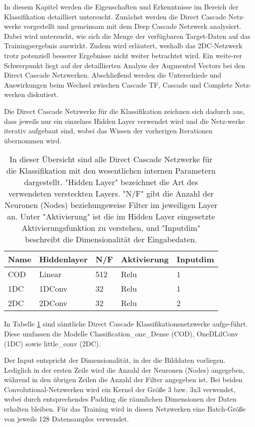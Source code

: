 In diesem Kapitel werden die Eigenschaften und Erkenntnisse im Bereich der Klassifikation detailliert untersucht. Zunächst werden die Direct 
Cascade Netz-werke vorgestellt und gemeinsam mit dem Deep Cascade Netzwerk analysiert. Dabei wird untersucht, wie sich die Menge der verfügbaren 
Target-Daten auf das Trainingsergebnis auswirkt. Zudem wird erläutert, weshalb das 2DC-Netzwerk trotz potenziell besserer Ergebnisse nicht weiter 
betrachtet wird. Ein weite-rer Schwerpunkt liegt auf der detaillierten Analyse der Augmented Vectors bei den Direct Cascade Netzwerken. 
Abschließend werden die Unterschiede und Auswirkungen beim Wechsel zwischen Cascade TF, Cascade und Complete Netz-werken diskutiert.

Die Direct Cascade Netzwerke für die Klassifikation zeichnen sich dadurch aus, dass jeweils nur ein einzelnes Hidden Layer verwendet wird und die 
Netz-werke iterativ aufgebaut sind, wobei das Wissen der vorherigen Iterationen übernommen wird. 

\begin{table}[h!]
    \centering    
    \begin{tabular}{l|l|l|l|l}
        \textbf{Name} & \textbf{Hiddenlayer} & \textbf{N/F} & \textbf{Aktivierung} & \textbf{Inputdim} \\
        \hline
        COD & Linear & 512 & Relu & 1 \\
        1DC & 1DConv & 32 & Relu & 1 \\
        2DC & 2DConv & 32 & Relu & 2
    \end{tabular}
    \caption{\small{In dieser Übersicht sind alle Direct Cascade Netzwerke für die Klassifikation mit den wesentlichen internen Parametern 
    dargestellt. "Hidden Layer" bezeichnet die Art des verwendeten versteckten Layers. "N/F" gibt die Anzahl der Neuronen (Nodes) beziehungsweise 
    Filter im jeweiligen Layer an. Unter "Aktivierung" ist die im Hidden Layer eingesetzte Aktivierungsfunktion zu verstehen, und "Inputdim" 
    beschreibt die Dimensionalität der Eingabedaten.}}
        \label{tab:classvor}
\end{table}

In Tabelle \ref{tab:classvor} sind sämtliche Direct Cascade Klassifikationsnetzwerke aufge-führt. Diese umfassen die Modelle 
Classification\_one\_Dense (COD), OneDLilConv (1DC) sowie little\_conv (2DC).

Der Input entspricht der Dimensionalität, in der die Bilddaten vorliegen. Lediglich in der ersten Zeile wird die Anzahl der Neuronen (Nodes) 
angegeben, während in den übrigen Zeilen die Anzahl der Filter angegeben ist. Bei beiden Convolutional-Netzwerken wird ein Kernel der Größe 3 
bzw. 3x3 verwendet, wobei durch entsprechendes Padding die räumlichen Dimensionen der Daten erhalten bleiben. Für das Training wird in diesen 
Netzwerken eine Batch-Größe von jeweils 128 Datensamples verwendet.
